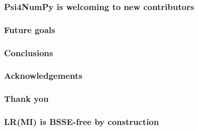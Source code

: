 \documentclass[%
    draft,%
    xcolor=usenames,dvipsnames,svgnames%
]{beamer}
\newcommand\pfn{Psi4NumPy}
\begin{document}
\begin{frame}
  \frametitle{\pfn{} is welcoming to new contributors}
\end{frame}

\begin{frame}
  \frametitle{Future goals}
\end{frame}

\begin{frame}
  \frametitle{Conclusions}
\end{frame}

\begin{frame}
  \frametitle{Acknowledgements}
\end{frame}

\begin{frame}
  \frametitle{Thank you}
\end{frame}

\appendix

\begin{frame}
  \frametitle{LR(MI) is BSSE-free by construction}
\end{frame}

\immediate\closeout\tempfile
\end{document}
